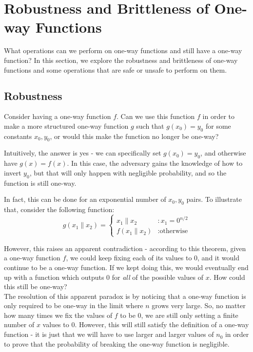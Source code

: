 \documentclass[12pt]{tufte-book}
\begin{document}
\section{Robustness and Brittleness of One-way Functions}
What operations can we perform on one-way functions and still have a one-way function? In this section, we explore the robustness and brittleness of one-way functions and some operations that are safe or unsafe to perform on them.

\subsection{Robustness}
Consider having a one-way function $f$.  Can we use this function $f$ in order to make a more structured one-way function $g$ such that $g(x_0) = y_0$ for some constants $x_0, y_0$, or would this make the function no longer be one-way? 

Intuitively, the answer is yes - we can specifically set $g(x_0) = y_0$, and otherwise have $g(x) = f(x)$.  In this case, the adversary gains the knowledge of how to invert $y_0$, but that will only happen with negligible probability, and so the function is still one-way.


In fact, this can be done for an exponential number of $x_0, y_0$ pairs. To illustrate that, consider the following function:
\[
  g(x_1\|x_2) = \left\{ \begin{array}{ll} x_1\|x_2 & : x_1 = 0^{n/2} \\ f(x_1\|x_2) & : \text{otherwise} \end{array} \right.
\]

However, this raises an apparent contradiction - according to this theorem, given a one-way function $f$, we could keep fixing each of its values to $0$, and it would continue to be a one-way function.  If we kept doing this, we would eventually end up with a function which outputs 0 for {\em all} of the possible values of $x$.  How could this still be one-way?\\

The resolution of this apparent paradox is by noticing that a one-way function is only required to be one-way in the limit where $n$ grows very large.  So, no matter how many times we fix the values of $f$ to be 0, we are still only setting a finite number of $x$ values to 0.  However, this will still satisfy the definition of a one-way function - it is just that we will have to use larger and larger values of $n_0$ in order to prove that the probability of breaking the one-way function is negligible.
\end{document}
